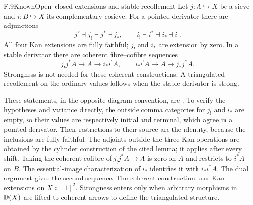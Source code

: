 \begin{claim}{F.9}{Known}{Open--closed extensions and stable recollement}
Let $j:A\hookrightarrow X$ be a sieve and $i:B\hookrightarrow X$ its complementary cosieve. For a pointed derivator there are adjunctions
\[
 j^?\dashv j_!\dashv j^*\dashv j_* ,\qquad
 i_!\dashv i^*\dashv i_*\dashv i^! .
\]
All four Kan extensions are fully faithful; $j_!$ and $i_*$ are extension by zero. In a stable derivator there are coherent fibre--cofibre sequences
\[
 j_!j^*A\longrightarrow A\longrightarrow i_*i^*A,
 \qquad
 i_*i^!A\longrightarrow A\longrightarrow j_*j^*A.
\]
Strongness is not needed for these coherent constructions. A triangulated recollement on the ordinary values follows when the stable derivator is strong.
\end{claim}
These statements, in the opposite diagram convention, are \citet[Lemma 3.7, Corollary 3.8, Theorem 4.16, and the recollement discussion in Section 4]{EFGroth2013}. To verify the hypotheses and variance directly, the outside comma categories for $j_!$ and $i_*$ are empty, so their values are respectively initial and terminal, which agree in a pointed derivator. Their restrictions to their source are the identity, because the inclusions are fully faithful. The adjoints outside the three Kan operations are obtained by the cylinder construction of the cited lemma; it applies after every shift. Taking the coherent cofibre of $j_!j^*A\to A$ is zero on $A$ and restricts to $i^*A$ on $B$. The essential-image characterization of $i_*$ identifies it with $i_*i^*A$. The dual argument gives the second sequence. The coherent construction uses Kan extensions on $X\times[1]^2$. Strongness enters only when arbitrary morphisms in $\mathbb D(X)$ are lifted to coherent arrows to define the triangulated structure.


